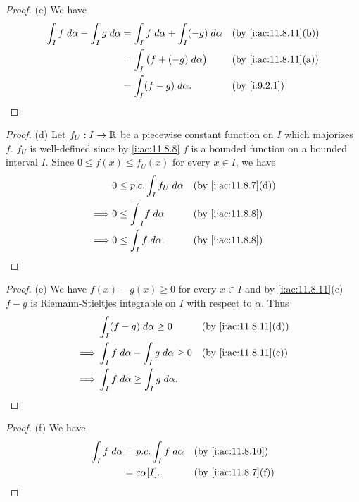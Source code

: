 \begin{proof}{(c)}
  We have
  \begin{align*}
    \int_I f \; d \alpha - \int_I g \; d \alpha & = \int_I f \; d \alpha + \int_I (-g) \; d \alpha &  & \by{i:ac:11.8.11}[b] \\
                                                & = \int_I \big(f + (-g) \; d \alpha\big)          &  & \by{i:ac:11.8.11}[a] \\
                                                & = \int_I (f - g) \; d \alpha.                    &  & \by{i:9.2.1}
  \end{align*}
\end{proof}

\begin{proof}{(d)}
  Let \(f_U : I \to \mathbb{R}\) be a piecewise constant function on \(I\) which majorizes \(f\).
  \(f_U\) is well-defined since by \cref{i:ac:11.8.8} \(f\) is a bounded function on a bounded interval \(I\).
  Since \(0 \leq f(x) \leq f_U(x)\) for every \(x \in I\), we have
  \begin{align*}
             & 0 \leq p.c. \int_I f_U \; d \alpha     &  & \by{i:ac:11.8.7}[d] \\
    \implies & 0 \leq \overline{\int}_I f \; d \alpha &  & \by{i:ac:11.8.8}    \\
    \implies & 0 \leq \int_I f \; d \alpha.           &  & \by{i:ac:11.8.8}
  \end{align*}
\end{proof}

\begin{proof}{(e)}
  We have \(f(x) - g(x) \geq 0\) for every \(x \in I\) and by \cref{i:ac:11.8.11}(c) \(f - g\) is Riemann-Stieltjes integrable on \(I\) with respect to \(\alpha\).
  Thus
  \begin{align*}
             & \int_I (f - g) \; d \alpha \geq 0                  &  & \by{i:ac:11.8.11}[d] \\
    \implies & \int_I f \; d \alpha - \int_I g \; d \alpha \geq 0 &  & \by{i:ac:11.8.11}[c] \\
    \implies & \int_I f \; d \alpha \geq \int_I g \; d \alpha.
  \end{align*}
\end{proof}

\begin{proof}{(f)}
  We have
  \begin{align*}
    \int_I f \; d \alpha & = p.c. \int_I f \; d \alpha &  & \by{i:ac:11.8.10}   \\
                         & = c \alpha[I].              &  & \by{i:ac:11.8.7}[f]
  \end{align*}
\end{proof}

